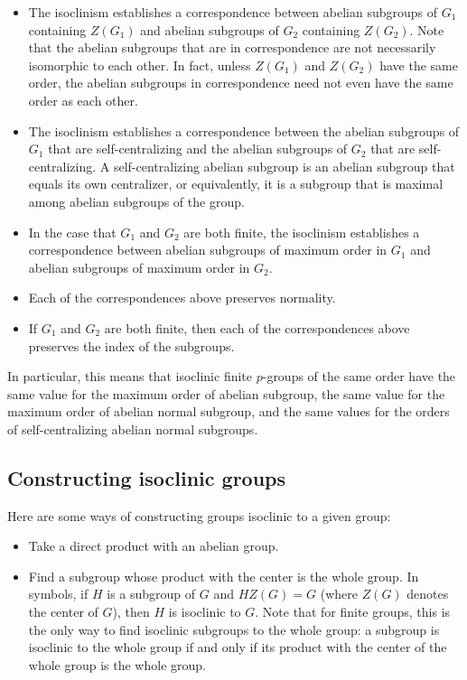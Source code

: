 \begin{itemize}
\item The isoclinism establishes a correspondence between abelian
  subgroups of $G_1$ containing $Z(G_1)$ and abelian subgroups of
  $G_2$ containing $Z(G_2)$. Note that the abelian subgroups that are
  in correspondence are not necessarily isomorphic to each other. In
  fact, unless $Z(G_1)$ and $Z(G_2)$ have the same order, the abelian
  subgroups in correspondence need not even have the same order as
  each other.
\item The isoclinism establishes a correspondence between the abelian
  subgroups of $G_1$ that are self-centralizing and the abelian
  subgroups of $G_2$ that are self-centralizing. A self-centralizing
  abelian subgroup is an abelian subgroup that equals its own
  centralizer, or equivalently, it is a subgroup that is maximal among
  abelian subgroups of the group.
\item In the case that $G_1$ and $G_2$ are both finite, the isoclinism
  establishes a correspondence between abelian subgroups of maximum
  order in $G_1$ and abelian subgroups of maximum order in
  $G_2$.
\item Each of the correspondences above preserves normality.
\item If $G_1$ and $G_2$ are both finite, then each of the
  correspondences above preserves the index of the subgroups.
\end{itemize}

In particular, this means that isoclinic finite $p$-groups of the same
order have the same value for the maximum order of abelian subgroup,
the same value for the maximum order of abelian normal subgroup, and
the same values for the orders of self-centralizing abelian normal
subgroups.

\subsection{Constructing isoclinic groups}

Here are some ways of constructing groups isoclinic to a given group:

\begin{itemize}
\item Take a direct product with an abelian group.
\item Find a subgroup whose product with the center is the whole
  group. In symbols, if $H$ is a subgroup of $G$ and $HZ(G) = G$
  (where $Z(G)$ denotes the center of $G$), then $H$ is isoclinic to
  $G$. Note that for finite groups, this is the only way to find
  isoclinic subgroups to the whole group: a subgroup is isoclinic to
  the whole group if and only if its product with the center of the
  whole group is the whole group.
\end{itemize}

